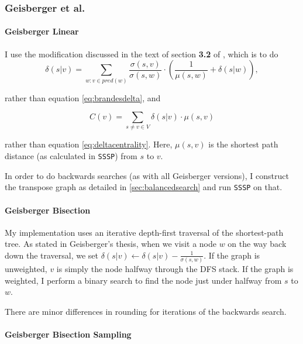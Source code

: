 \documentclass[12pt,a4paper,twoside,openright]{report}
\newcommand{\ttt}[1]{\texttt{#1}}
\begin{document}
			\subsubsection{Geisberger et al.}
			
				\paragraph{Geisberger Linear}
					I use the modification discussed in the text of section \textbf{3.2} of \cite{geisberger}, which is to do \begin{equation} \label{eq:geisbergerlineardelta}
							\delta(s|v) = \sum_{w: v \in pred(w)} \frac{\sigma(s,v)}{\sigma(s,w)} \cdot (\frac{1}{\mu(s,w)}+\delta(s|w)),
					\end{equation}
					
					rather than equation \ref{eq:brandesdelta}, and 
					
					\begin{equation}
					C(v) =  \sum_{s\neq v \in V} \delta(s|v) \cdot \mu(s,v)
					\end{equation}
					
					rather than equation \ref{eq:deltacentrality}. Here, $\mu(s,v)$ is the shortest path distance (as calculated in \ttt{SSSP}) from $s$ to $v$.
					
					In order to do backwards searches (as with all Geisberger versions), I construct the transpose graph as detailed in \ref{sec:balancedsearch} and run \ttt{SSSP} on that.
					
					\paragraph{Geisberger Bisection}
					
					My implementation uses an iterative depth-first traversal of the shortest-path tree. As stated in Geisberger's thesis, when we visit a node $w$ on the way back down the traversal, we set $\delta(s|v) \leftarrow \delta(s|v) - \frac{1}{\sigma(s,w)}$. If the graph is unweighted, $v$ is simply the node halfway through the DFS stack. If the graph is weighted, I perform a binary search to find the node just under halfway from $s$ to $w$.
					
					There are minor differences in rounding for iterations of the backwards search.
					
					\paragraph{Geisberger Bisection Sampling}
			
\end{document}
